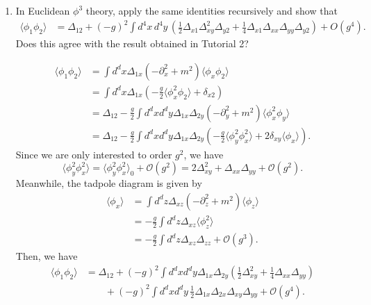 \begin{enumerate}[label=\alph*)]
    \item In Euclidean $\phi^3$ theory, apply the same identities recursively and
    show that
    \begin{align}
        \langle\phi_1\phi_2\rangle
        &={}
        \Delta_{12}
        +(-g)^2\int d^4x\,d^4y\,
        \left(
            \frac{1}{2}\Delta_{x1}\Delta_{xy}^2\Delta_{y2}
            +\frac{1}{4}\Delta_{x1}\Delta_{xx}\Delta_{yy}\Delta_{y2}
        \right)
        +O(g^4).
    \end{align}
    Does this agree with the result obtained in Tutorial 2?
    \begin{solution}
        \begin{equation}
            \begin{aligned}
                \langle\phi_1\phi_2\rangle &= \int d^dx \Delta_{1x}(-\partial_x^2 + m^2)\langle\phi_x\phi_2\rangle\\
                &=  \int d^dx \Delta_{1x}\left(-\frac{g}{2}\langle\phi_x^2\phi_2\rangle + \delta   _{x2}\right)\\
                &= \Delta_{12} - \frac{g}{2}\int d^dx d^dy \Delta_{1x}\Delta_{2y}(-\partial_y^2 + m^2)\langle\phi_x^2\phi_y\rangle\\
                &= \Delta_{12} - \frac{g}{2}\int d^dx d^dy \Delta_{1x}\Delta_{2y}\left(-\frac{g}{2}\langle\phi^2_y\phi_x^2\rangle + 2\delta_{xy}\langle\phi_x\rangle\right).
            \end{aligned}
        \end{equation}
        Since we are only interested to order $g^2$, we have
        \begin{equation}
            \langle\phi^2_y\phi_x^2\rangle  = \langle\phi^2_y\phi_x^2\rangle_0 + \mathcal{O}(g^2) = 2\Delta_{xy}^2 + \Delta_{xx}\Delta_{yy}+ \mathcal{O}(g^2).
        \end{equation}
        Meanwhile, the tadpole diagram is given by
        \begin{equation}
        \begin{aligned}
            \langle\phi_x\rangle &= \int d^dz \Delta_{xz}(-\partial_z^2+m^2)\langle\phi_z\rangle\\
            &=-\frac{g}{2}\int d^dz \Delta_{xz}\langle\phi_z^2\rangle\\
            &=-\frac{g}{2}\int d^dz \Delta_{xz}\Delta_{zz} + \mathcal{O}(g^3).
        \end{aligned}
        \end{equation}
        Then, we have
        \begin{equation}
            \begin{aligned}
                \langle\phi_1\phi_2\rangle &= \Delta_{12} +(-g)^2\int d^dx d^dy \Delta_{1x}\Delta_{2y}\left(\frac{1}{2}\Delta_{xy}^2 + \frac14\Delta_{xx}\Delta_{yy}\right)\\
                &\qquad+ (-g)^2\int d^dx d^dy\,\frac{1}{2}\Delta_{1x}\Delta_{2x}\Delta_{xy}\Delta_{yy} + \mathcal{O}(g^4).
            \end{aligned}
        \end{equation}
    \end{solution}


\end{enumerate}
